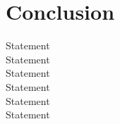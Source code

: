 \documentclass{article}
\begin{document}
\section{Conclusion}
\begin{algorithm}[H]
    \begin{algorithmic}
        \State Statement 
        \EndFor\\
        \State Statement 
        \EndFor\\
        \State Statement 
        \EndFor\\
        \State Statement 
        \EndFor\\
        \State Statement 
        \EndFor\\
        \State Statement 
        \EndFor\\
    \end{algorithmic}
\end{algorithm}
\end{document}

